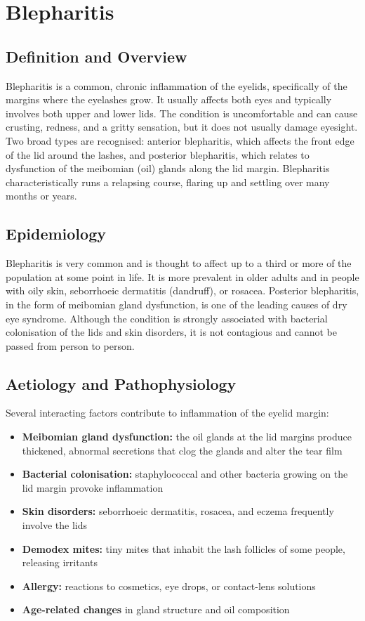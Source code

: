 \chapter{Blepharitis}

\section*{Definition and Overview}
Blepharitis is a common, chronic inflammation of the eyelids, specifically of the margins where the eyelashes grow. It usually affects both eyes and typically involves both upper and lower lids. The condition is uncomfortable and can cause crusting, redness, and a gritty sensation, but it does not usually damage eyesight. Two broad types are recognised: anterior blepharitis, which affects the front edge of the lid around the lashes, and posterior blepharitis, which relates to dysfunction of the meibomian (oil) glands along the lid margin. Blepharitis characteristically runs a relapsing course, flaring up and settling over many months or years.

\section*{Epidemiology}
Blepharitis is very common and is thought to affect up to a third or more of the population at some point in life. It is more prevalent in older adults and in people with oily skin, seborrhoeic dermatitis (dandruff), or rosacea. Posterior blepharitis, in the form of meibomian gland dysfunction, is one of the leading causes of dry eye syndrome. Although the condition is strongly associated with bacterial colonisation of the lids and skin disorders, it is not contagious and cannot be passed from person to person.

\section*{Aetiology and Pathophysiology}
Several interacting factors contribute to inflammation of the eyelid margin:

\begin{itemize}
    \item \textbf{Meibomian gland dysfunction:} the oil glands at the lid margins produce thickened, abnormal secretions that clog the glands and alter the tear film
    \item \textbf{Bacterial colonisation:} staphylococcal and other bacteria growing on the lid margin provoke inflammation
    \item \textbf{Skin disorders:} seborrhoeic dermatitis, rosacea, and eczema frequently involve the lids
    \item \textbf{Demodex mites:} tiny mites that inhabit the lash follicles of some people, releasing irritants
    \item \textbf{Allergy:} reactions to cosmetics, eye drops, or contact-lens solutions
    \item \textbf{Age-related changes} in gland structure and oil composition
\end{itemize}

